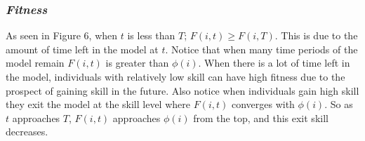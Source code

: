 \documentclass[12pt,letterpaper]{article}
\begin{document}
      

    \subsubsection{\it Fitness}      
      As seen in Figure 6, when $t$ is less than $T$; $F(i,t) \ge F(i,T)$.
      This is due to the amount of time left in the model at $t$.
      Notice that when many time periods of the model remain $F(i,t)$ is greater than $\phi(i)$. %
      When there is a lot of time left in the model, individuals with relatively low skill can have high fitness due to the prospect of gaining skill in the future.    
      Also notice when individuals gain high skill they exit the model at the skill level where $F(i,t)$ converges with $\phi(i)$.
      So as $t$ approaches $T$, $F(i,t)$ approaches $\phi(i)$ from the top, and this exit skill decreases.


      
      
\end{document}
